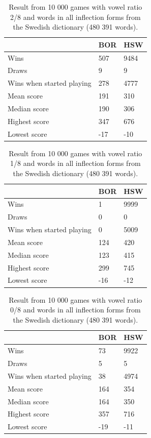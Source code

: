 \documentclass[a4paper, 12pt]{report}
\begin{document}
\begin{table}[h]
\centering
    \begin{tabular}{ l | l | l }
   	& BOR & HSW \\
   	\hline
   	Wins & 507 & 9484 \\
	Draws & 9 & 9 \\
	Wins when started playing & 278 & 4777 \\   	
	Mean score & 191 & 310 \\
	Median score & 190 & 306 \\	 	 
	Highest score & 347 & 676 \\
	Lowest score & -17 & -10 \\		
    \end{tabular}
\caption{Result from 10 000 games with vowel ratio 2/8 and words in all inflection forms from the Swedish dictionary (480 391 words).}
\label{tab:borhswstats2}
\end{table}

\begin{table}[h]
\centering
    \begin{tabular}{ l | l | l }
   	& BOR & HSW \\
   	\hline
   	Wins & 1 & 9999 \\
	Draws & 0 & 0 \\
	Wins when started playing & 0 & 5009 \\   	
	Mean score & 124 & 420 \\
	Median score & 123 & 415 \\	 	 
	Highest score & 299 & 745 \\
	Lowest score & -16 & -12 \\		
    \end{tabular}
\caption{Result from 10 000 games with vowel ratio 1/8 and words in all inflection forms from the Swedish dictionary (480 391 words).}
\label{tab:borhswstats1}
\end{table}

\begin{table}[h]
\centering
    \begin{tabular}{ l | l | l }
   	& BOR & HSW \\
   	\hline
   	Wins & 73 & 9922 \\
	Draws & 5 & 5 \\
	Wins when started playing & 38 & 4974 \\   	
	Mean score & 164 & 354 \\
	Median score & 164 & 350 \\	 	 
	Highest score & 357 & 716 \\
	Lowest score & -19 & -11 \\		
    \end{tabular}
\caption{Result from 10 000 games with vowel ratio 0/8 and words in all inflection forms from the Swedish dictionary (480 391 words).}
\label{tab:borhswstats0}
\end{table}
\end{document}
